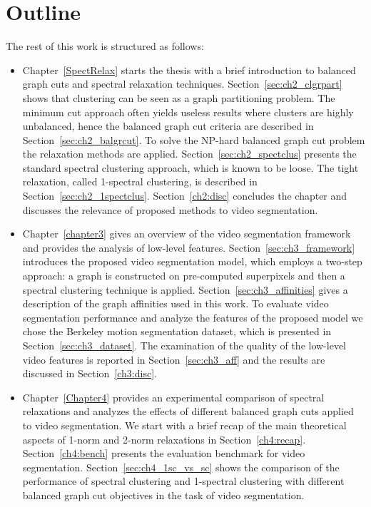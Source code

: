 \section{Outline}
The rest of this work is structured as follows:
\begin{itemize}
\item Chapter~\ref{SpectRelax} starts the thesis with a brief introduction to balanced graph cuts and spectral relaxation techniques.
Section~\ref{sec:ch2_clgrpart} shows that clustering can be seen as a graph partitioning problem. The minimum cut approach often yields useless results where clusters are highly unbalanced, hence
the balanced graph cut criteria are described in Section~\ref{sec:ch2_balgrcut}.  To solve the NP-hard balanced graph cut problem
the relaxation methods are applied. Section~\ref{sec:ch2_spectclus} presents the standard spectral clustering approach, which is known to be loose.
The tight relaxation, called 1-spectral clustering, is described in Section~\ref{sec:ch2_1spectclus}. 
Section~\ref{ch2:disc} concludes the chapter and discusses the relevance of proposed methods to video segmentation.
\item Chapter~\ref{chapter3} gives an overview of the video segmentation framework and provides the analysis of low-level features.
Section~\ref{sec:ch3_framework} introduces the proposed video segmentation model, which employs a two-step approach:
a graph is constructed on pre-computed superpixels and then a spectral clustering technique is applied. 
Section~\ref{sec:ch3_affinities} gives a description of the graph affinities used in this work.
To evaluate video segmentation performance and analyze the features of the proposed model we chose the Berkeley motion segmentation dataset, which is presented in Section~\ref{sec:ch3_dataset}.  
The examination of the quality of the low-level video features is reported in Section~\ref{sec:ch3_aff} and the results are discussed in Section~\ref{ch3:disc}.
\item Chapter~\ref{Chapter4} provides an experimental comparison of spectral relaxations and analyzes the effects of different balanced graph cuts applied to video segmentation. 
We start with a brief recap of the main theoretical aspects of 1-norm and 2-norm relaxations in Section~\ref{ch4:recap}.
Section~\ref{ch4:bench} presents the evaluation benchmark for video segmentation.
Section~\ref{sec:ch4_1sc_vs_sc} shows the comparison of the performance of spectral clustering and 1-spectral clustering with different balanced graph cut objectives in the task of video segmentation. 

\end{itemize}
